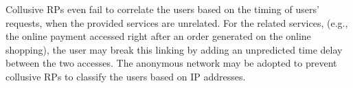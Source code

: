 \begin{itemize}

\end{itemize}

Collusive RPs even fail to correlate the users based on the timing of users' requests, when the provided services are unrelated. For the related services, (e.g., the online payment accessed right after an order generated on the online shopping), the user may break this linking by adding an unpredicted time delay between the two accesses. The anonymous network may be adopted to prevent collusive RPs to classify the users based on IP addresses.

\begin{comment}
\begin{itemize}
  \item A \textbf{curious} RP fails to infer the user's unique identifier (i.e., UID) through $PUID$.
   \item A \textbf{collusive curious} RP fails to link a user between RPs.
  \item A \textbf{malicious} RP fails to make the UID leaked.
  \item The \textbf{collusive malicious RPs} fail to (actively) make the UID leaked.
  \item The \textbf{collusive malicious RPs} fail to actively trigger the generation of a same PPID or derivable PPIDs.
  \item The \textbf{collusive malicious RPs} fail to passively link a user between RPs.
\end{itemize}
\end{comment}

